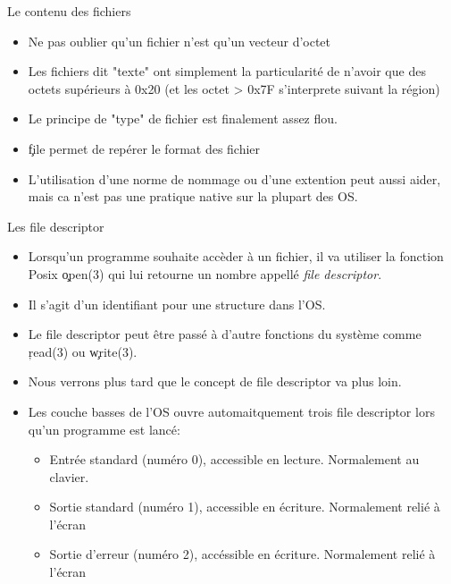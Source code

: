 \begin{frame}[fragile=singleslide]{Le contenu des fichiers}
  \begin{itemize}
    \item Ne pas oublier qu'un fichier n'est qu'un vecteur d'octet
    \item Les fichiers dit "texte" ont simplement la particularité de
      n'avoir que des octets supérieurs à 0x20 (et les octet > 0x7F
      s'interprete suivant la région)
    \item Le principe de "type" de fichier est finalement assez flou.
    \item \c{file} permet de repérer le format des fichier
    \item L'utilisation d'une norme de nommage ou d'une extention peut
      aussi aider, mais ca n'est pas une pratique native sur la
      plupart des OS.
    \end{itemize}
\end{frame}

\begin{frame}[fragile=singleslide]{Les file descriptor}
  \begin{itemize}
  \item Lorsqu'un programme souhaite accèder à un fichier, il va
    utiliser la fonction Posix \c{open(3)} qui lui retourne un nombre
    appellé \emph{file descriptor}.
  \item Il s'agit d'un identifiant pour une structure dans l'OS.
  \item Le file descriptor peut être passé à d'autre fonctions du
    système comme \c{read(3)} ou \c{write(3)}.
  \item Nous verrons plus tard que le concept de file descriptor va
    plus loin.
  \item Les couche basses de l'OS ouvre automaitquement trois file
    descriptor lors qu'un programme est lancé:
    \begin{itemize}
    \item Entrée standard (numéro 0), accessible en
      lecture. Normalement au clavier.
    \item Sortie standard (numéro 1), accessible en
      écriture. Normalement relié à l'écran
    \item Sortie d'erreur (numéro 2), accéssible en
      écriture. Normalement relié à l'écran
    \end{itemize}
  \end{itemize}
\end{frame}

